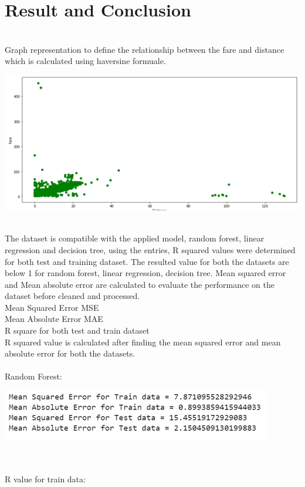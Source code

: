 \documentclass[journal,twoside,web]{ieeecolor}
\begin{document}
\section{Result and Conclusion}
\label{Result and  Conclusion}
\\
Graph representation to define the relationship between the fare and distance which is calculated using haversine formuale.
\begin{center}
\includegraphics[scale=0.50]{Picture25.png}
\end{center}
\\
The dataset is compatible with the applied model, random forest, linear regression and decision tree, using the entries, R squared values were determined for both test and training dataset. The resulted value for both the datasets are below 1 for random forest, linear regression, decision tree. Mean squared error and Mean absolute error are calculated to evaluate the performance on the dataset before cleaned and processed.
\\
Mean Squared Error MSE
\\
Mean Absolute Error MAE
\\
R square for both test and train dataset
\\
R squared value is calculated after finding the mean squared error and mean absolute error for both the datasets.
\\
\\
Random Forest:  
\begin{center}
\includegraphics[scale=0.60]{Picture15.png}
\end{center}
\\
\\
R value for train data:
\end{document}
